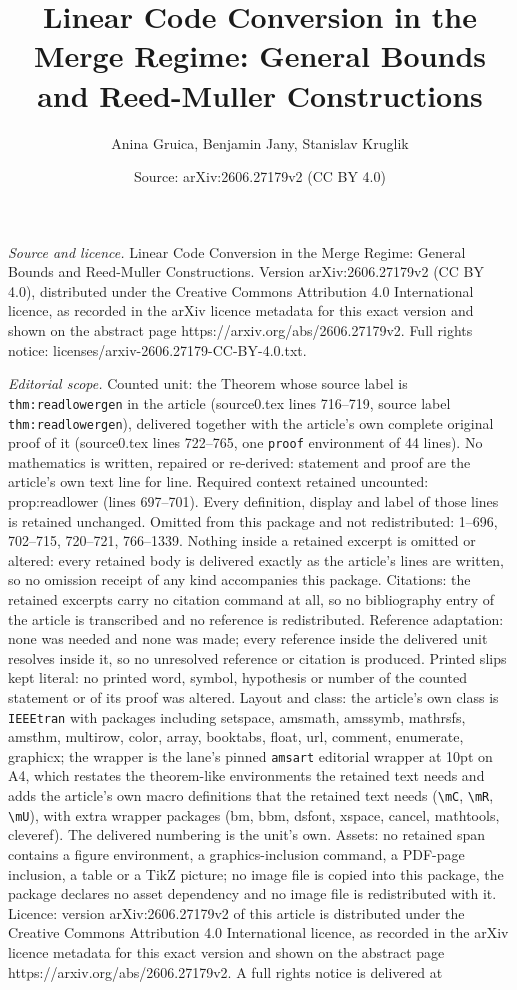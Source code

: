 \documentclass[10pt,a4paper]{amsart}
\title[Linear Code Conversion in the Merge Regime: General Bounds a]{Linear Code Conversion in the Merge Regime: General Bounds and Reed-Muller Constructions}
\author{Anina Gruica, Benjamin Jany, Stanislav Kruglik}
\date{Source: arXiv:2606.27179v2 (CC BY 4.0)}
\begin{document}
\maketitle

\noindent\emph{Source and licence.} Linear Code Conversion in the Merge Regime: General Bounds and Reed-Muller Constructions. Version arXiv:2606.27179v2 (CC BY 4.0), distributed under the Creative Commons Attribution 4.0 International licence, as recorded in the arXiv licence metadata for this exact version and shown on the abstract page https://arxiv.org/abs/2606.27179v2. Full rights notice: licenses/arxiv-2606.27179-CC-BY-4.0.txt.\par\smallskip

\noindent\textit{Editorial scope.} Counted unit: the Theorem whose source label is \texttt{thm:readlowergen} in the article (source0.tex lines 716--719, source label \texttt{thm:readlowergen}), delivered together with the article's own complete original proof of it (source0.tex lines 722--765, one \texttt{proof} environment of 44 lines). No mathematics is written, repaired or re-derived: statement and proof are the article's own text line for line. Required context retained uncounted: prop:readlower (lines 697--701). Every definition, display and label of those lines is retained unchanged. Omitted from this package and not redistributed: 1--696, 702--715, 720--721, 766--1339. Nothing inside a retained excerpt is omitted or altered: every retained body is delivered exactly as the article's lines are written, so no omission receipt of any kind accompanies this package. Citations: the retained excerpts carry no citation command at all, so no bibliography entry of the article is transcribed and no reference is redistributed. Reference adaptation: none was needed and none was made; every reference inside the delivered unit resolves inside it, so no unresolved reference or citation is produced. Printed slips kept literal: no printed word, symbol, hypothesis or number of the counted statement or of its proof was altered. Layout and class: the article's own class is \texttt{IEEEtran} with packages including setspace, amsmath, amssymb, mathrsfs, amsthm, multirow, color, array, booktabs, float, url, comment, enumerate, graphicx; the wrapper is the lane's pinned \texttt{amsart} editorial wrapper at 10pt on A4, which restates the theorem-like environments the retained text needs and adds the article's own macro definitions that the retained text needs (\texttt{\textbackslash mC}, \texttt{\textbackslash mR}, \texttt{\textbackslash mU}), with extra wrapper packages (bm, bbm, dsfont, xspace, cancel, mathtools, cleveref). The delivered numbering is the unit's own. Assets: no retained span contains a figure environment, a graphics-inclusion command, a PDF-page inclusion, a table or a TikZ picture; no image file is copied into this package, the package declares no asset dependency and no image file is redistributed with it. Licence: version arXiv:2606.27179v2 of this article is distributed under the Creative Commons Attribution 4.0 International licence, as recorded in the arXiv licence metadata for this exact version and shown on the abstract page https://arxiv.org/abs/2606.27179v2. A full rights notice is delivered at 
\end{document}
